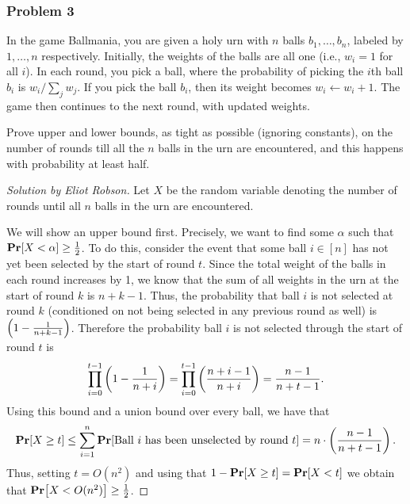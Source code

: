 \documentclass{article}
\newenvironment{solution}[1]{\begin{proof}[Solution by #1]}{\end{proof}}
\begin{document}
\subsubsection{Problem 3}
In the game Ballmania, you are given a holy urn with \(n\) balls \(b_1, \dots, b_n\), labeled by \(1, \dots, n\) respectively. Initially, the weights of the balls are all one (i.e., \(w_i = 1\) for all \(i\)). In each round, you pick a ball, where the probability of picking the \(i\)th ball \(b_i\) is \(w_i / \sum_j w_j\). If you pick the ball \(b_i\), then its weight becomes \(w_i \leftarrow w_i + 1\). The game then continues to the next round, with updated weights.

Prove upper and lower bounds, as tight as possible (ignoring constants), on the number of rounds till all the \(n\) balls in the urn are encountered, and this happens with probability at least half.


\begin{solution}{Eliot Robson}
    
    
    
    Let \(X\) be the random variable denoting the number of rounds until all \(n\) balls in the urn are encountered.
    
    We will show an upper bound first. Precisely, we want to find some \(\alpha\) such that \(\Prob{X < \alpha} \geq \frac{1}{2}\). To do this, consider the event that some ball \(i \in [n]\) has not yet been selected by the start of round \(t\). Since the total weight of the balls in each round increases by 1, we know that the sum of all weights in the urn at the start of round \(k\) is \(n + k - 1\). Thus, the probability that ball \(i\) is not selected at round \(k\) (conditioned on not being selected in any previous round as well) is \(\del{1 - \frac{1}{n + k - 1}}\). Therefore the probability ball \(i\) is not selected through the start of round \(t\) is 
    \[
        \prod_{i = 0}^{t-1} \del{1 - \frac{1}{n + i}}
        =%
        \prod_{i = 0}^{t-1} \del{\frac{n + i - 1}{n + i}}
        =%
        \frac{n - 1}{n + t - 1}.
    \]
    Using this bound and a union bound over every ball, we have that
    \[
        \Prob{X \geq t}
        \leq
        \sum_{i=1}^{n} \Prob{\text{Ball \(i\) has been unselected by round \(t\)}}
        =
        n \cdot \del{\frac{n - 1}{n + t - 1}}.
    \]
    Thus, setting \(t = O(n^2)\) and using that \(1 - \Prob{X \geq t} = \Prob{X < t}\) we obtain that \(\Prob{X < O(n^2)} \geq \frac{1}{2}\).
\end{solution}
\end{document}
